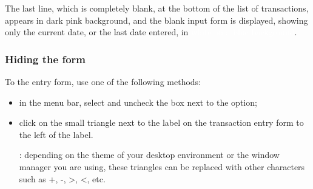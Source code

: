The last line, which is completely blank, at the bottom of the list of transactions, appears in \colorbox[RGB]{245,155,155}{dark pink background}, and the blank input form is displayed, showing only the current date, or the last date entered, in \colorbox[RGB]{61,174,233}{\textcolor{white}{\textsf{white on a blue background}}}.

\subsubsection{Hiding the form\label{transactions-new-exposure-hide}}

To  the entry form, use one of the following methods:

\begin{itemize}
	\item in the menu bar, select  and uncheck the box next to the  option;
	\item click on the small triangle next to the label  on the transaction entry form to the left of the label.
	
	\Note{}: depending on the theme of your desktop environment or the window manager you are using, these triangles can be replaced with other characters such as +, -, >, <, etc.
\end{itemize}


